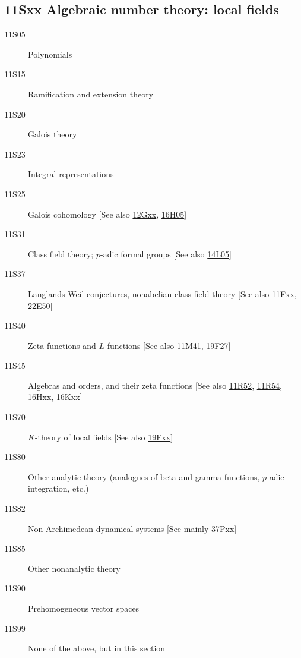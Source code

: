\documentclass[letterpaper]{article}
\begin{document}
\subsection*{11Sxx  Algebraic number theory: local fields }\label{11Sxx}
\begin{description}  
\item [11S05]\label{11S05} Polynomials
\item [11S15]\label{11S15} Ramification and extension theory
\item [11S20]\label{11S20} Galois theory
\item [11S23]\label{11S23} Integral representations
\item [11S25]\label{11S25} Galois cohomology [See also \hyperref[12Gxx]{12Gxx}, \hyperref[16H05]{16H05}]
\item [11S31]\label{11S31} Class field theory; $p$-adic formal groups [See also \hyperref[14L05]{14L05}]
\item [11S37]\label{11S37} Langlands-Weil conjectures, nonabelian class field theory [See also \hyperref[11Fxx]{11Fxx}, \hyperref[22E50]{22E50}]
\item [11S40]\label{11S40} Zeta functions and $L$-functions [See also \hyperref[11M41]{11M41}, \hyperref[19F27]{19F27}]
\item [11S45]\label{11S45} Algebras and orders, and their zeta functions [See also \hyperref[11R52]{11R52}, \hyperref[11R54]{11R54}, \hyperref[16Hxx]{16Hxx}, \hyperref[16Kxx]{16Kxx}]
\item [11S70]\label{11S70} $K$-theory of local fields [See also \hyperref[19Fxx]{19Fxx}]
\item [11S80]\label{11S80} Other analytic theory (analogues of beta and gamma functions, $p$-adic integration, etc.)
\item [11S82]\label{11S82} Non-Archimedean dynamical systems [See mainly \hyperref[37Pxx]{37Pxx}]
\item [11S85]\label{11S85} Other nonanalytic theory
\item [11S90]\label{11S90} Prehomogeneous vector spaces
\item [11S99]\label{11S99} None of the above, but in this section
\end{description}
\end{document}
